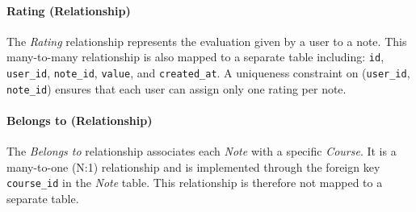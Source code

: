 \paragraph{Rating (Relationship)}
The \textit{Rating} relationship represents the evaluation given by a user to a note. This many-to-many relationship is also mapped to a separate table including: \texttt{id}, \texttt{user\_id}, \texttt{note\_id}, \texttt{value}, and \texttt{created\_at}.
A uniqueness constraint on (\texttt{user\_id}, \texttt{note\_id}) ensures that each user can assign only one rating per note.

\paragraph{Belongs to (Relationship)}
The \textit{Belongs to} relationship associates each \textit{Note} with a specific \textit{Course}. It is a many-to-one (N:1) relationship and is implemented through the foreign key \texttt{course\_id} in the \textit{Note} table. This relationship is therefore not mapped to a separate table.